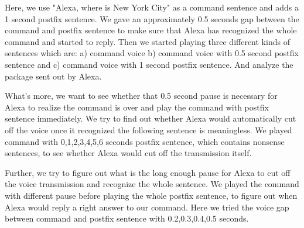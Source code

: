 Here, we use "Alexa, where is New York City" as a command sentence and adds a 1 second postfix sentence. We gave an approximately 0.5 seconds gap between the command and postfix sentence to make sure that Alexa has recognized the whole command and started to reply. Then we started playing three different kinds of sentences which are: a) command voice b) command voice with 0.5 second postfix sentence and c) command voice with 1 second postfix sentence. And analyze the package sent out by Alexa.

What's more, we want to see whether that 0.5 second pause is necessary for Alexa to realize the command is over and play the command with postfix sentence immediately. We try to find out whether Alexa would automatically cut off the voice once it recognized the following sentence is meaningless. We played command with 0,1,2,3,4,5,6 seconds postfix sentence, which contains nonsense sentences, to see whether Alexa would cut off the transmission itself.

Further, we try to figure out what is the long enough pause for Alexa to cut off the voice transmission and recognize the whole sentence. We played the command with different pause before playing the whole postfix sentence, to figure out when Alexa would reply a right answer to our command. Here we tried the voice gap between command and postfix sentence with 0.2,0.3,0.4,0.5 seconds.


